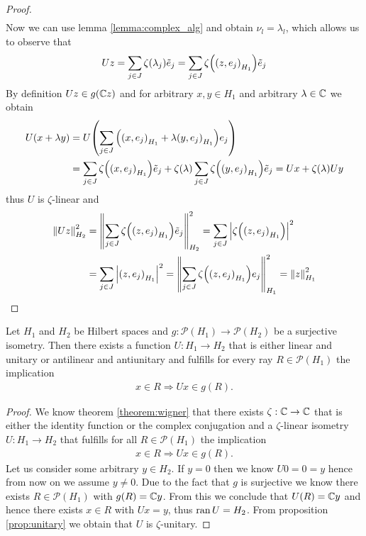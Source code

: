 \begin{proof}
\begin{align*}
	\end{align*}
	Now we can use lemma \ref{lemma:complex_alg} and obtain $\nu_l = \lambda_l$, which allows us to observe that 
	\begin{align*}
		Uz = \sum_{j \in J} \zeta(\lambda_j) \tilde{e}_j = \sum_{j \in J} \zeta\pbraces{\pbraces{z, e_j}_{H_1}}\tilde{e}_j
	\end{align*}
	By definition $Uz \in g(\C z)$ and for arbitrary $x,y \in H_1$ and arbitrary $\lambda \in \C$ we obtain
	\begin{align*}
		U(x + \lambda y) &= U \pbraces{\sum_{j \in J} \pbraces{\pbraces{x, e_j}_{H_1} + \lambda \pbraces{y, e_j}_{H_1}} e_j} \\
		&= \sum_{j \in J} \zeta\pbraces{\pbraces{x, e_j}_{H_1}} \tilde{e}_j + \zeta(\lambda) \sum_{j \in J} \zeta\pbraces{\pbraces{y, e_j}_{H_1}} \tilde{e}_j = Ux + \zeta\pbraces{\lambda} Uy
	\end{align*}
	thus $U$ is $\zeta$-linear and 
	\begin{align*}
		\norm[H_2]{Uz}^2 &= \norm[H_2]{\sum_{j \in J} \zeta\pbraces{\pbraces{z, e_j}_{H_1}} \tilde{e}_j}^2 = \sum_{j \in J} \vbraces{\zeta\pbraces{\pbraces{z, e_j}_{H_1}}}^2  \\
		&= \sum_{j \in J} \vbraces{\pbraces{z, e_j}_{H_1}}^2 = \norm[H_1]{\sum_{j \in J} \zeta\pbraces{\pbraces{z, e_j}_{H_1}} e_j}^2 = \norm[H_1]{z}^2
	\end{align*}
\end{proof}


\begin{corollary}
	Let $H_1$ and $H_2$ be Hilbert spaces and $g: \mathcal{P}(H_1) \to \mathcal{P}(H_2)$ be a surjective isometry. Then there exists a function $U: H_1 \to H_2$ that is either linear and unitary or antilinear and antiunitary and fulfills for every ray $R \in \mathcal{P}(H_1)$ the implication
	\begin{align*}
	x \in R \Rightarrow Ux \in g(R).
	\end{align*}
\end{corollary}

\begin{proof}
	We know theorem \ref{theorem:wigner} that there exists $\zeta: \C \to \C$ that is either the identity function or the complex conjugation and a $\zeta$-linear isometry $U: H_1 \to H_2$ that fulfills for all $R \in \mathcal{P}(H_1)$ the implication
	\begin{align*}
		x \in R \Rightarrow Ux \in g(R).
	\end{align*}
	Let us consider some arbitrary $y \in H_2$. If $y = 0$ then we know $U0 = 0 = y$ hence from now on we assume $y \neq 0$. Due to the fact that $g$ is surjective we know there exists $R \in \mathcal{P}(H_1)$ with $g(R) = \C y$. From this we conclude that $U(R) = \C y$ and hence there exists $x \in R$ with $Ux = y$, thus $\ran U = H_2$. From proposition \ref{prop:unitary} we obtain that $U$ is $\zeta$-unitary.
\end{proof}